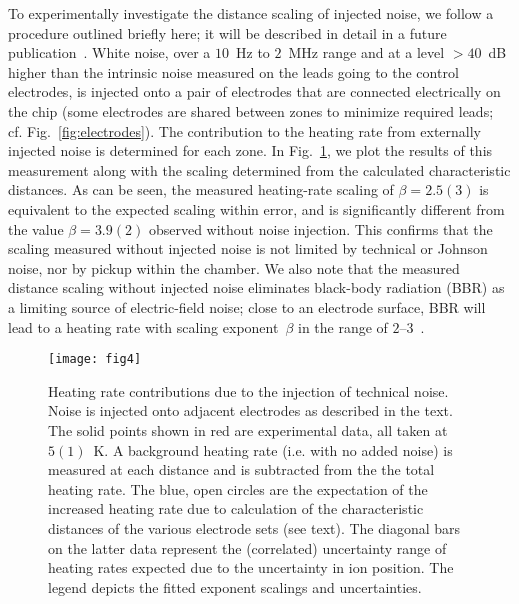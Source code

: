 \documentclass[reprint,twocolumn,prl,amsmath,amssymb,longbibliography,aps,superscriptaddress]{revtex4-1}
\begin{document}
To experimentally investigate the distance scaling of injected noise, we follow a procedure outlined briefly here; it will be described in detail in a future publication~\cite{arxiv_noise_paper}.  White noise, over a $10$~Hz to $2$~MHz range and at a level $>40$~dB higher than the intrinsic noise measured on the leads going to the control electrodes, is injected onto a pair of electrodes that are connected electrically on the chip (some electrodes are shared between zones to minimize required leads; cf. Fig.~\ref{fig:electrodes}).  The contribution to the heating rate from externally injected noise is determined for each zone.  In Fig.~\ref{fig:NoiseScaling}, we plot the results of this measurement along with the scaling determined from the calculated characteristic distances.  As can be seen, the measured heating-rate scaling of $\beta=2.5(3)$ is equivalent to the expected scaling within error, and is significantly different from the value $\beta=3.9(2)$ observed without noise injection.  This confirms that the scaling measured without injected noise is not limited by technical or Johnson noise, nor by pickup within the chamber.  We also note that the measured distance scaling without injected noise eliminates black-body radiation (BBR) as a limiting source of electric-field noise; close to an electrode surface, BBR will lead to a heating rate with scaling exponent~$\beta$ in the range of $2$--$3$~\cite{Brownnutt2015}.

\begin{figure}[t b !]
\texttt{[image: fig4]}
\caption{Heating rate contributions due to the injection of technical noise. Noise is injected onto adjacent electrodes as described in the text.  The solid points shown in red are experimental data, all taken at $5(1)$~K.  A background heating rate (i.e. with no added noise) is measured at each distance and is subtracted from the the total heating rate.  The blue, open circles are the expectation of the increased heating rate due to calculation of the characteristic distances of the various electrode sets (see text).  The diagonal bars on the latter data represent the (correlated) uncertainty range of heating rates expected due to the uncertainty in ion position.  The legend depicts the fitted exponent scalings and uncertainties.}
\label{fig:NoiseScaling}
\end{figure}
\end{document}
